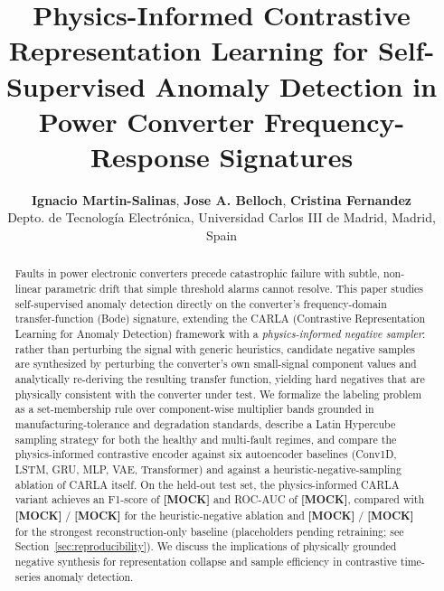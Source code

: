 \documentclass[11pt,a4paper]{article}
\title{\textbf{Physics-Informed Contrastive Representation Learning for Self-Supervised Anomaly Detection in Power Converter Frequency-Response Signatures}}
\author{
    \textbf{Ignacio Martin-Salinas}, \textbf{Jose A. Belloch}, \textbf{Cristina Fernandez} \\
    \small Depto. de Tecnolog\'{i}a Electr\'{o}nica, Universidad Carlos III de Madrid, Madrid, Spain
}
\date{}
\begin{document}
\maketitle

\begin{center}
\end{center}

\begin{abstract}
Faults in power electronic converters precede catastrophic failure with subtle,
non-linear parametric drift that simple threshold alarms cannot resolve. This paper
studies self-supervised anomaly detection directly on the converter's frequency-domain
transfer-function (Bode) signature, extending the CARLA (Contrastive Representation
Learning for Anomaly Detection) framework with a \emph{physics-informed negative
sampler}: rather than perturbing the signal with generic heuristics, candidate negative
samples are synthesized by perturbing the converter's own small-signal component values
and analytically re-deriving the resulting transfer function, yielding hard negatives
that are physically consistent with the converter under test. We formalize the
labeling problem as a set-membership rule over component-wise multiplier bands
grounded in manufacturing-tolerance and degradation standards, describe a Latin
Hypercube sampling strategy for both the healthy and multi-fault regimes, and compare
the physics-informed contrastive encoder against six autoencoder baselines (Conv1D,
LSTM, GRU, MLP, VAE, Transformer) and against a heuristic-negative-sampling ablation of
CARLA itself. On the held-out test set, the physics-informed CARLA variant achieves an
F1-score of \textbf{[MOCK]} and ROC-AUC of \textbf{[MOCK]}, compared with
\textbf{[MOCK]} / \textbf{[MOCK]} for the heuristic-negative ablation and
\textbf{[MOCK]} / \textbf{[MOCK]} for the strongest reconstruction-only baseline
(placeholders pending retraining; see Section~\ref{sec:reproducibility}). We discuss the
implications of physically grounded negative synthesis for representation collapse and
sample efficiency in contrastive time-series anomaly detection.
\end{abstract}
\end{document}
